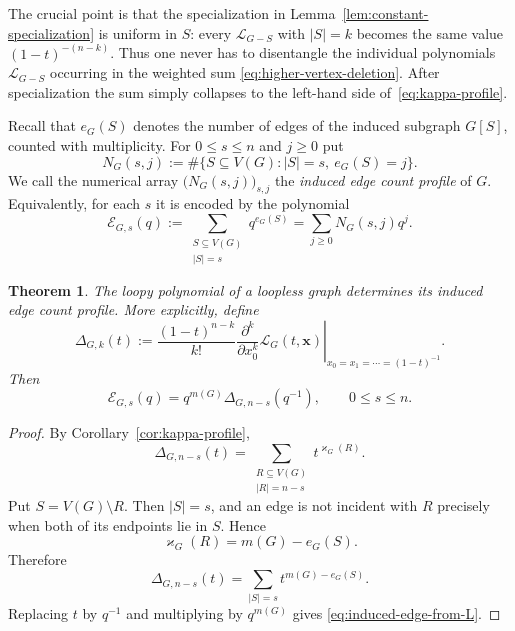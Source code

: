 \documentclass[11pt]{article}
\theoremstyle{plain}
\newtheorem{theorem}{Theorem}[section]
\theoremstyle{definition}
\renewcommand{\mathcal}{\mathscr}
\newcommand{\LL}{\mathcal{L}}    %
\newcommand{\cE}{\mathcal{E}}    %
\newcommand{\bx}{\mathbf{x}}
\newcommand{\kp}{\varkappa}
\numberwithin{equation}{section}
\begin{document}
The crucial point is that the specialization in Lemma~\ref{lem:constant-specialization} is uniform in $S$: every
$\LL_{G-S}$ with $|S|=k$ becomes the same value $(1-t)^{-(n-k)}$.  Thus one never has to disentangle the individual
polynomials $\LL_{G-S}$ occurring in the weighted sum
\eqref{eq:higher-vertex-deletion}. After specialization the sum simply collapses to the left-hand side of~\eqref{eq:kappa-profile}.

Recall that $e_G(S)$ denotes the number of edges of the induced subgraph
$G[S]$, counted with multiplicity.  For $0\le s\le n$ and $j\ge 0$ put
\begin{equation}\label{eq:induced-edge-array}
   N_G(s,j)
   :=
   \#\{S\subseteq V(G): |S|=s,\ e_G(S)=j\}.
\end{equation}
We call the numerical array $\bigl(N_G(s,j)\bigr)_{s,j}$ the
\emph{induced edge count profile} of $G$.  Equivalently, for each $s$ it is
encoded by the polynomial
\begin{equation}\label{eq:induced-edge-polynomial}
   \cE_{G,s}(q)
   :=
   \sum_{\substack{S\subseteq V(G)\\ |S|=s}}q^{e_G(S)}
   =\sum_{j\ge 0}N_G(s,j)q^j.
\end{equation}

\begin{theorem}\label{thm:induced-edge-profile}
The loopy polynomial of a loopless graph determines its
induced edge count profile.  More explicitly, define
\begin{equation}\label{eq:Delta-definition}
   \Delta_{G,k}(t)
   :=
   \frac{(1-t)^{n-k}}{k!}
   \left.
      \frac{\partial^k}{\partial x_0^k}\LL_G(t,\bx)
   \right|_{x_0=x_1=\cdots=(1-t)^{-1}} .
\end{equation}
Then
\begin{equation}\label{eq:induced-edge-from-L}
   \cE_{G,s}(q)
   =
   q^{m(G)}\Delta_{G,n-s}(q^{-1}),
   \qquad 0\le s\le n.
\end{equation}
\end{theorem}

\begin{proof}
By Corollary~\ref{cor:kappa-profile},
\[
   \Delta_{G,n-s}(t)
   =
   \sum_{\substack{R\subseteq V(G)\\ |R|=n-s}}
      t^{\kp_G(R)}.
\]
Put $S=V(G)\setminus R$.  Then $|S|=s$, and an edge is not incident with
$R$ precisely when both of its endpoints lie in $S$.  Hence
\[
   \kp_G(R)=m(G)-e_G(S).
\]
Therefore
\[
   \Delta_{G,n-s}(t)
   =
   \sum_{|S|=s}t^{m(G)-e_G(S)}.
\]
Replacing $t$ by $q^{-1}$ and multiplying by $q^{m(G)}$ gives
\eqref{eq:induced-edge-from-L}.
\end{proof}
\end{document}
